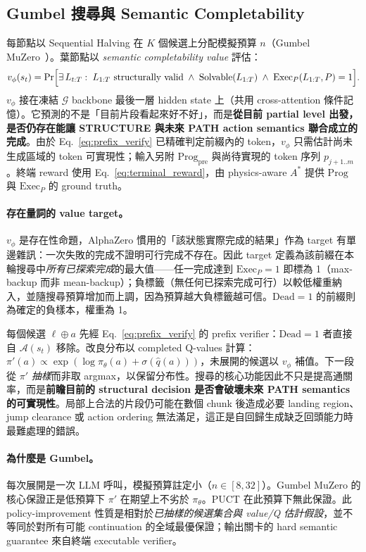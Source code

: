 \documentclass[11pt,a4paper]{article}
\newcommand{\Gp}{\mathcal{G}}
\newcommand{\lv}{\ell}
\begin{document}
\subsection{Gumbel 搜尋與 Semantic Completability}
\label{sec:completion_value}
每節點以 Sequential Halving 在 $K$ 個候選上分配模擬預算 $n$（Gumbel MuZero~\cite{danihelka2022}）。葉節點以 \emph{semantic completability value} 評估：
\begin{equation}
v_\phi(s_t)=\Pr\Bigl[\exists\,L_{t:T}:\; L_{1:T}\text{ structurally valid}\;\land\;\mathrm{Solvable}(L_{1:T})\;\land\;\mathrm{Exec}_{P}(L_{1:T},P)=1\Bigr].
\label{eq:semantic_completability}
\end{equation}
$v_\phi$ 接在凍結 $\Gp$ backbone 最後一層 hidden state 上（共用 cross-attention 條件記憶）。它預測的不是「目前片段看起來好不好」，而是\textbf{從目前 partial level 出發，是否仍存在能讓 STRUCTURE 與未來 PATH action semantics 聯合成立的完成}。由於 Eq.~\eqref{eq:prefix_verify} 已精確判定前綴內的 token，$v_\phi$ 只需估計尚未生成區域的 token 可實現性；輸入另附 $\mathrm{Prog}_{\mathrm{pre}}$ 與尚待實現的 token 序列 $p_{j+1..m}$。終端 reward 使用 Eq.~\eqref{eq:terminal_reward}，由 physics-aware $A^*$ 提供 $\mathrm{Prog}$ 與 $\mathrm{Exec}_P$ 的 ground truth。

\paragraph{存在量詞的 value target。}$v_\phi$ 是存在性命題，AlphaZero 慣用的「該狀態實際完成的結果」作為 target 有單邊雜訊：一次失敗的完成不證明可行完成不存在。因此 target 定義為該前綴在本輪搜尋中\emph{所有已探索完成}的最大值——任一完成達到 $\mathrm{Exec}_P=1$ 即標為 1（max-backup 而非 mean-backup）；負標籤（無任何已探索完成可行）以較低權重納入，並隨搜尋預算增加而上調，因為預算越大負標籤越可信。$\mathrm{Dead}=1$ 的前綴則為確定的負樣本，權重為 1。

每個候選 $\lv\oplus a$ 先經 Eq.~\eqref{eq:prefix_verify} 的 prefix verifier：$\mathrm{Dead}=1$ 者直接自 $\mathcal{A}(s_t)$ 移除。改良分布以 completed Q-values 計算：$\pi'(a)\propto\exp(\log\pi_\theta(a)+\sigma(\hat q(a)))$，未展開的候選以 $v_\phi$ 補值。下一段從 $\pi'$ \emph{抽樣}而非取 argmax，以保留分布性。搜尋的核心功能因此不只是提高通關率，而是\textbf{前瞻目前的 structural decision 是否會破壞未來 PATH semantics 的可實現性}。局部上合法的片段仍可能在數個 chunk 後造成必要 landing region、jump clearance 或 action ordering 無法滿足，這正是自回歸生成缺乏回頭能力時最難處理的錯誤。

\paragraph{為什麼是 Gumbel。}每次展開是一次 LLM 呼叫，模擬預算註定小（$n\in[8,32]$）。Gumbel MuZero 的核心保證正是低預算下 $\pi'$ 在期望上不劣於 $\pi_\theta$。PUCT 在此預算下無此保證。此 policy-improvement 性質是相對於\emph{已抽樣的候選集合與 value/Q 估計假設}，並不等同於對所有可能 continuation 的全域最優保證；輸出關卡的 hard semantic guarantee 來自終端 executable verifier。
\end{document}
